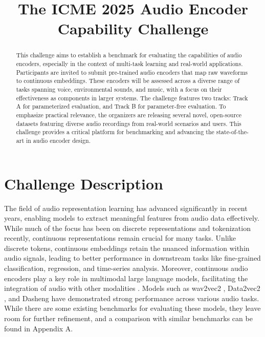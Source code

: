 \documentclass{article}
\title{The ICME 2025 Audio Encoder Capability Challenge}
\date{}
\begin{document}
\maketitle

\begin{abstract}
This challenge aims to establish a benchmark for evaluating the capabilities of audio encoders, especially in the context of multi-task learning and real-world applications.
Participants are invited to submit pre-trained audio encoders that map raw waveforms to continuous embeddings.
These encoders will be assessed across a diverse range of tasks spanning voice, environmental sounds, and music, with a focus on their effectiveness as components in larger systems.
The challenge features two tracks: Track A for parameterized evaluation, and Track B for parameter-free evaluation.
To emphasize practical relevance, the organizers are releasing several novel, open-source datasets featuring diverse audio recordings from real-world scenarios and users.
This challenge provides a critical platform for benchmarking and advancing the state-of-the-art in audio encoder design.
\end{abstract}

\section{Challenge Description}

The field of audio representation learning has advanced significantly in recent years, enabling models to extract meaningful features from audio data effectively. While much of the focus has been on discrete representations and tokenization \cite{van2017neural,mentzer2023finite,kumar2024high,siuzdak2024snac,kyutai2024moshi} recently, continuous representations remain crucial for many tasks. Unlike discrete tokens, continuous embeddings retain the nuanced information within audio signals, leading to better performance \cite{wang2024comparative} in downstream tasks like fine-grained classification, regression, and time-series analysis. Moreover, continuous audio encoders play a key role in multimodal large language models, facilitating the integration of audio with other modalities \cite{chu2023qwen,xie2024mini,yu2024salmonn}. Models such as wav2vec2 \cite{baevski2020wav2vec}, Data2vec2 \cite{baevski2022data2vec}, and Dasheng \cite{dinkel2024dasheng} have demonstrated strong performance across various audio tasks. While there are some existing benchmarks for evaluating these models, they leave room for further refinement, and a comparison with similar benchmarks can be found in Appendix A.
\end{document}
